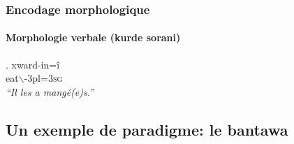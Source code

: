 \begin{frame}
\frametitle{Encodage morphologique}
\framesubtitle{Morphologie verbale (kurde sorani)}

\ex. xward-in\alert{=î} \\
eat$\backslash$\sii-{\sc 3pl}=\textsc{3sg}\\
{\em ``Il les a mangé(e)s.''}

\end{frame}

\subsection[Bantawa]{Un exemple de paradigme: le bantawa}


